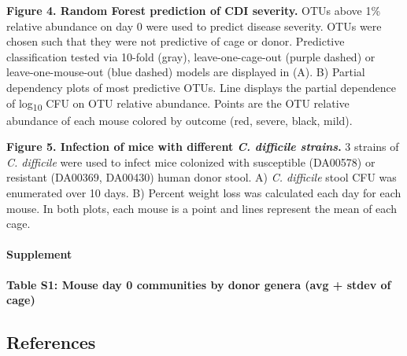 \documentclass[11pt,]{article}
\begin{document}
\textbf{Figure 4. Random Forest prediction of CDI severity.} OTUs above
1\% relative abundance on day 0 were used to predict disease severity.
OTUs were chosen such that they were not predictive of cage or donor.
Predictive classification tested via 10-fold (gray), leave-one-cage-out
(purple dashed) or leave-one-mouse-out (blue dashed) models are
displayed in (A). B) Partial dependency plots of most predictive OTUs.
Line displays the partial dependence of log\textsubscript{10} CFU on OTU
relative abundance. Points are the OTU relative abundance of each mouse
colored by outcome (red, severe, black, mild).

\textbf{Figure 5. Infection of mice with different \emph{C. difficile
strains}.} 3 strains of \emph{C. difficile} were used to infect mice
colonized with susceptible (DA00578) or resistant (DA00369, DA00430)
human donor stool. A) \emph{C. difficile} stool CFU was enumerated over
10 days. B) Percent weight loss was calculated each day for each mouse.
In both plots, each mouse is a point and lines represent the mean of
each cage.

\paragraph{Supplement}\label{supplement}

\textbf{Table S1: Mouse day 0 communities by donor genera (avg + stdev
of cage)}

\newpage

\subsection{References}\label{references}
\end{document}
